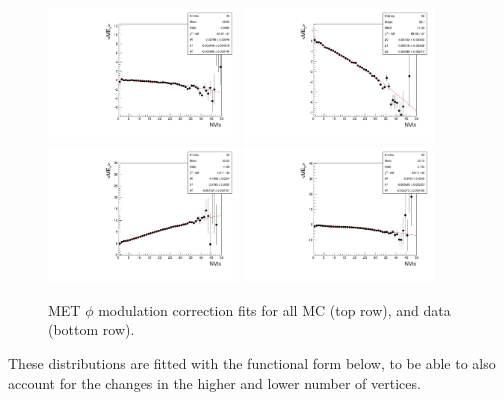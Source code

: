 \begin{figure}[htbp]
  \begin{center}
    \includegraphics[width=0.45\textwidth]{analysis_figs/linear_fit_mcx.pdf}
    \includegraphics[width=0.45\textwidth]{analysis_figs/linear_fit_mcy.pdf}
    \includegraphics[width=0.45\textwidth]{analysis_figs/linear_fit_datax.pdf}
    \includegraphics[width=0.45\textwidth]{analysis_figs/linear_fit_datay.pdf}
    \caption{ MET $\phi$ modulation correction fits for all MC (top row), and data (bottom row). }
    \label{fig:metfits}
  \end{center}
\end{figure}

These distributions are fitted with the functional form below, to be able to also account for the changes in the higher and lower number of vertices.

